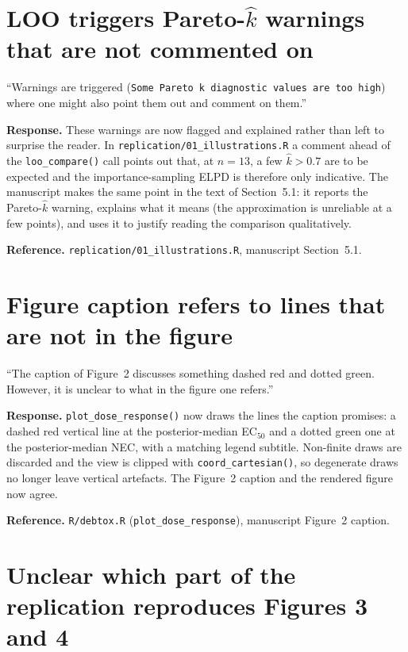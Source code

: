\documentclass[11pt,a4paper]{article}
\newcommand{\code}[1]{\texttt{#1}}
\begin{document}
\section{LOO triggers Pareto-$\hat{k}$ warnings that are not commented
on}

\begin{displayquote}
``Warnings are triggered (\code{Some Pareto k diagnostic values are too
high}) where one might also point them out and comment on them.''
\end{displayquote}

\textbf{Response.} These warnings are now flagged and explained rather
than left to surprise the reader. In
\code{replication/01\_illustrations.R} a comment ahead of the
\code{loo\_compare()} call points out that, at $n = 13$, a few
$\hat{k} > 0.7$ are to be expected and the importance-sampling ELPD is
therefore only indicative. The manuscript makes the same point in the
text of Section~5.1: it reports the Pareto-$\hat{k}$ warning, explains
what it means (the approximation is unreliable at a few points), and uses
it to justify reading the comparison qualitatively.

\textbf{Reference.} \code{replication/01\_illustrations.R}, manuscript
Section~5.1.

\section{Figure caption refers to lines that are not in the figure}

\begin{displayquote}
``The caption of Figure~2 discusses something dashed red and dotted
green. However, it is unclear to what in the figure one refers.''
\end{displayquote}

\textbf{Response.} \code{plot\_dose\_response()} now draws the lines the
caption promises: a dashed red vertical line at the posterior-median
EC$_{50}$ and a dotted green one at the posterior-median NEC, with a
matching legend subtitle. Non-finite draws are discarded and the view is
clipped with \code{coord\_cartesian()}, so degenerate draws no longer
leave vertical artefacts. The Figure~2 caption and the rendered figure
now agree.

\textbf{Reference.} \code{R/debtox.R} (\code{plot\_dose\_response}),
manuscript Figure~2 caption.

\section{Unclear which part of the replication reproduces Figures 3 and
4}
\end{document}
